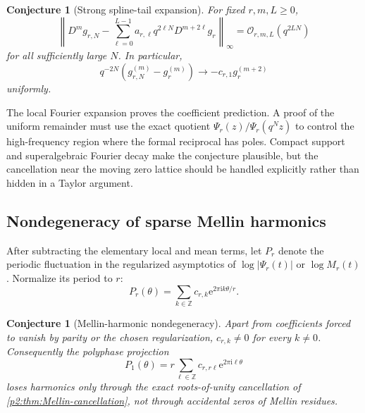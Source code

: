 \documentclass[11pt,oneside]{article}
\newtheorem{conjecture}[theorem]{Conjecture}
\theoremstyle{definition}
\newcommand{\e}{\mathrm e}
\newcommand{\ii}{\mathrm i}
\newcommand{\Z}{\mathbb Z}
\newcommand{\bigO}{\mathcal O}
\begin{document}
\begin{conjecture}[Strong spline-tail expansion]
\label{p2:conj:strong-tail}
For fixed $r,m,L\ge0$,
\begin{equation}
 \left\|D^m g_{r,N}-
   \sum_{\ell=0}^{L-1}a_{r,\ell}q^{2\ell N}
      D^{m+2\ell}g_r\right\|_{\infty}
 =\bigO_{r,m,L}(q^{2LN})                                  \label{p2:eq:strong-tail-conj}
\end{equation}
for all sufficiently large $N$.
In particular,
\begin{equation}
 q^{-2N}(g_{r,N}^{(m)}-g_r^{(m)})
 \longrightarrow-c_{r,1}g_r^{(m+2)}                       \label{p2:eq:first-tail-limit}
\end{equation}
uniformly.
\end{conjecture}

The local Fourier expansion proves the coefficient prediction.  A proof of the
uniform remainder must use the exact quotient
$\Psi_r(z)/\Psi_r(q^Nz)$ to control the high-frequency region where the formal
reciprocal has poles.  Compact support and superalgebraic Fourier decay make the
conjecture plausible, but the cancellation near the moving zero lattice should
be handled explicitly rather than hidden in a Taylor argument.

\subsection{Nondegeneracy of sparse Mellin harmonics}

After subtracting the elementary local and mean terms, let $P_r$ denote the
periodic fluctuation in the regularized asymptotics of $\log|\Psi_r(t)|$ or
$\log M_r(t)$.  Normalize its period to $r$:
\begin{equation}
 P_r(\theta)=\sum_{k\in\Z}c_{r,k}\e^{2\pi\ii k\theta/r}.  \label{p2:eq:Pr-conj-Fourier}
\end{equation}

\begin{conjecture}[Mellin-harmonic nondegeneracy]
\label{p2:conj:Mellin-nondegenerate}
Apart from coefficients forced to vanish by parity or the chosen
regularization, $c_{r,k}\ne0$ for every $k\ne0$.  Consequently the polyphase
projection
\begin{equation}
 P_1(\theta)=r\sum_{\ell\in\Z}c_{r,r\ell}\e^{2\pi\ii\ell\theta} \label{p2:eq:Pr-projection-conj}
\end{equation}
loses harmonics only through the exact roots-of-unity cancellation of
\cref{p2:thm:Mellin-cancellation}, not through accidental zeros of Mellin residues.
\end{conjecture}
\end{document}
